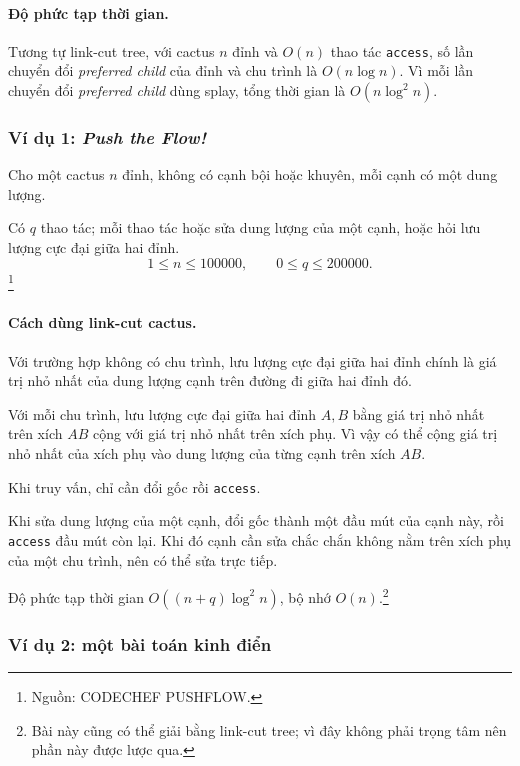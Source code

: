 \documentclass[11pt]{article}
\begin{document}
\paragraph{Độ phức tạp thời gian.}
Tương tự link-cut tree, với cactus \(n\) đỉnh và \(O(n)\) thao tác
\texttt{access}, số lần chuyển đổi \emph{preferred child} của đỉnh và chu trình
là \(O(n\log n)\). Vì mỗi lần chuyển đổi \emph{preferred child} dùng splay,
tổng thời gian là \(O(n\log^2 n)\).

\subsubsection{\texorpdfstring{Ví dụ 1: \emph{Push the Flow!}}{Ví dụ 1: Push the Flow!}}

Cho một cactus \(n\) đỉnh, không có cạnh bội hoặc khuyên, mỗi cạnh có một dung
lượng.

Có \(q\) thao tác; mỗi thao tác hoặc sửa dung lượng của một cạnh, hoặc hỏi lưu
lượng cực đại giữa hai đỉnh.
\[
  1\le n\le 100000,\qquad 0\le q\le 200000.
\]
\footnote{Nguồn: CODECHEF PUSHFLOW.}

\paragraph{Cách dùng link-cut cactus.}
Với trường hợp không có chu trình, lưu lượng cực đại giữa hai đỉnh chính là giá
trị nhỏ nhất của dung lượng cạnh trên đường đi giữa hai đỉnh đó.

Với mỗi chu trình, lưu lượng cực đại giữa hai đỉnh \(A,B\) bằng giá trị nhỏ
nhất trên xích \(AB\) cộng với giá trị nhỏ nhất trên xích phụ. Vì vậy có thể
cộng giá trị nhỏ nhất của xích phụ vào dung lượng của từng cạnh trên xích
\(AB\).

Khi truy vấn, chỉ cần đổi gốc rồi \texttt{access}.

Khi sửa dung lượng của một cạnh, đổi gốc thành một đầu mút của cạnh này, rồi
\texttt{access} đầu mút còn lại. Khi đó cạnh cần sửa chắc chắn không nằm trên
xích phụ của một chu trình, nên có thể sửa trực tiếp.

Độ phức tạp thời gian \(O((n+q)\log^2 n)\), bộ nhớ \(O(n)\).\footnote{Bài này
cũng có thể giải bằng link-cut tree; vì đây không phải trọng tâm nên phần này
được lược qua.}

\subsubsection{Ví dụ 2: một bài toán kinh điển}
\end{document}
